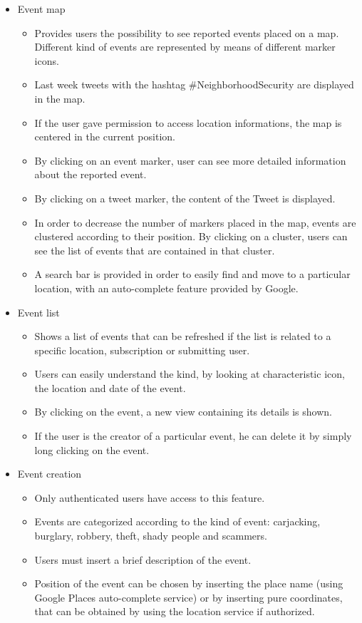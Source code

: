 \documentclass[a4paper]{scrreprt}
\begin{document}
\begin{itemize}
\item Event map
\begin{itemize}
\item Provides users the possibility to see reported events placed on a map. Different kind of events are represented by means of different marker icons.
\item Last week tweets with the hashtag \#NeighborhoodSecurity are displayed in the map.
\item If the user gave permission to access location informations, the map is centered in the current position.
\item By clicking on an event marker, user can see more detailed information about the reported event.
\item By clicking on a tweet marker, the content of the Tweet is displayed.
\item In order to decrease the number of markers placed in the map, events are clustered according to their position. By clicking on a cluster, users can see the list of events that are contained in that cluster.
\item A search bar is provided in order to easily find and move to a particular location, with an auto-complete feature provided by Google.
\end{itemize}

\item Event list
\begin{itemize}
\item Shows a list of events that can be refreshed if the list is related to a specific location, subscription or submitting user. 
\item Users can easily understand the kind, by looking at characteristic icon, the location and date of the event.
\item By clicking on the event, a new view containing its details is shown.
\item If the user is the creator of a particular event, he can delete it by simply long clicking on the event.
\end{itemize}

\item Event creation
\begin{itemize}
\item Only authenticated users have access to this feature.
\item Events are categorized according to the kind of event: carjacking, burglary, robbery, theft, shady people and scammers.
\item Users must insert a brief description of the event.
\item Position of the event can be chosen by inserting the place name (using Google Places auto-complete service) or by inserting pure coordinates, that can be obtained by using the location service if authorized.
\end{itemize}


\end{itemize}
\end{document}
